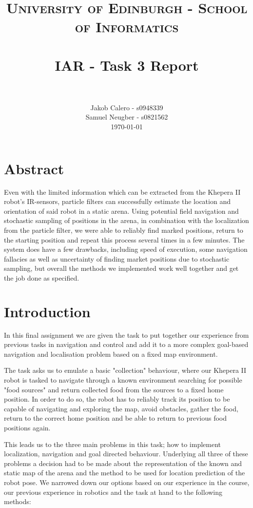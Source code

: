 \documentclass[paper=a4, fontsize=12pt]{scrartcl}	%
\title{
\vspace{-1in} 	
\usefont{OT1}{bch}{b}{n}
\normalfont \normalsize \textsc{University of Edinburgh - School of Informatics}
\\ [25pt]
\horrule{0.5pt} \\[0.4cm]
\large IAR - Task 3 Report \\
\horrule{1pt} \\[0.5cm]
}
\author{
  \normalfont \normalsize
  Jakob Calero - s0948339\\[-3pt]\normalsize
  Samuel Neugber - s0821562\\[-3pt]\normalsize
  \today
}
\date{}
\numberwithin{equation}{section}		%
\numberwithin{figure}{section}			%
\numberwithin{table}{section}				%
\begin{document}
\maketitle					%
\section{Abstract}
Even with the limited information which can be extracted from the Khepera II robot's IR-sensors, particle filters can successfully estimate the location and orientation of said robot in a static arena. Using potential field navigation and stochastic sampling of positions in the arena, in combination with the localization from the particle filter, we were able to reliably find marked positions, return to the starting position and repeat this process several times in a few minutes. The system does have a few drawbacks, including speed of execution, some navigation fallacies as well as uncertainty of finding market positions due to stochastic sampling, but overall the methods we implemented work well together and get the job done as specified.

\section{Introduction}
In this final assignment we are given the task to put together our experience from previous tasks in navigation and control and add it to a more complex goal-based navigation and localisation problem based on a fixed map environment.

The task asks us to emulate a basic "collection" behaviour, where our Khepera II robot is tasked to navigate through a known environment searching for possible "food sources" and return collected food from the sources to a fixed home position. In order to do so, the robot has to reliably track its position to be capable of navigating and exploring the map, avoid obstacles, gather the food, return to the correct home position and be able to return to previous food positions again.

This leads us to the three main problems in this task; how to implement localization, navigation and goal directed behaviour. Underlying all three of these problems a decision had to be made about the representation of the known and static map of the arena and the method to be used for location prediction of the robot pose. We narrowed down our options based on our experience in the course, our previous experience in robotics and the task at hand to the following methods:
\end{document}
